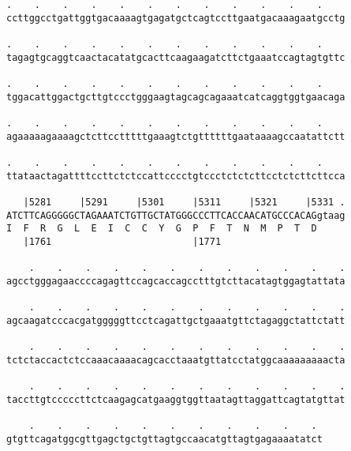 \documentclass{article}
\begin{document}
\begin{Verbatim}
.    .    .    .    .    .    .    .    .    .    .    .    
ccttggcctgattggtgacaaaagtgagatgctcagtccttgaatgacaaagaatgcctg
                                                            
.    .    .    .    .    .    .    .    .    .    .    .    
tagagtgcaggtcaactacatatgcacttcaagaagatcttctgaaatccagtagtgttc
                                                            
.    .    .    .    .    .    .    .    .    .    .    .    
tggacattggactgcttgtccctgggaagtagcagcagaaatcatcaggtggtgaacaga
                                                            
.    .    .    .    .    .    .    .    .    .    .    .    
agaaaaagaaaagctcttcctttttgaaagtctgttttttgaataaaagccaatattctt
                                                            
.    .    .    .    .    .    .    .    .    .    .    .    
ttataactagattttccttctctccattcccctgtccctctctcttcctctcttcttcca
                                                            
   |5281     |5291     |5301     |5311     |5321     |5331 .
ATCTTCAGGGGGCTAGAAATCTGTTGCTATGGGCCCTTCACCAACATGCCCACAGgtaag
I  F  R  G  L  E  I  C  C  Y  G  P  F  T  N  M  P  T  D     
   |1761                         |1771                      
  
    .    .    .    .    .    .    .    .    .    .    .    .
agcctgggagaaccccagagttccagcaccagcctttgtcttacatagtggagtattata
                                                            
    .    .    .    .    .    .    .    .    .    .    .    .
agcaagatcccacgatgggggttcctcagattgctgaaatgttctagaggctattctatt
                                                            
    .    .    .    .    .    .    .    .    .    .    .    .
tctctaccactctccaaacaaaacagcacctaaatgttatcctatggcaaaaaaaaacta
                                                            
    .    .    .    .    .    .    .    .    .    .    .    .
taccttgtcccccttctcaagagcatgaaggtggttaatagttaggattcagtatgttat
                                                            
    .    .    .    .    .    .    .    .    .    .    . 
gtgttcagatggcgttgagctgctgttagtgccaacatgttagtgagaaaatatct
                                                        
                                                        
 

\end{Verbatim}
\end{document}
